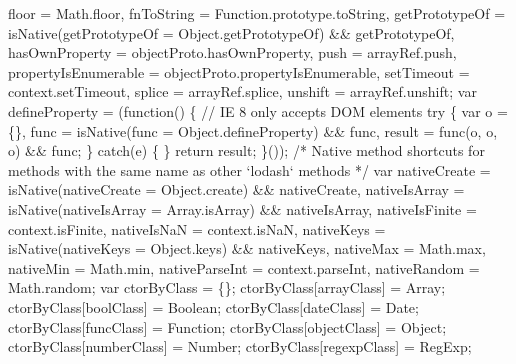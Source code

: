\begin{DoxyCodeInclude}
\textcolor{stringliteral}{        floor = Math.floor,}
\textcolor{stringliteral}{        fnToString = Function.prototype.toString,}
\textcolor{stringliteral}{        getPrototypeOf = isNative(getPrototypeOf = Object.getPrototypeOf) && getPrototypeOf,}
\textcolor{stringliteral}{        hasOwnProperty = objectProto.hasOwnProperty,}
\textcolor{stringliteral}{        push = arrayRef.push,}
\textcolor{stringliteral}{        propertyIsEnumerable = objectProto.propertyIsEnumerable,}
\textcolor{stringliteral}{        setTimeout = context.setTimeout,}
\textcolor{stringliteral}{        splice = arrayRef.splice,}
\textcolor{stringliteral}{        unshift = arrayRef.unshift;}
\textcolor{stringliteral}{}
\textcolor{stringliteral}{    var defineProperty = (function() \{}
\textcolor{stringliteral}{      // IE 8 only accepts DOM elements}
\textcolor{stringliteral}{      try \{}
\textcolor{stringliteral}{        var o = \{\},}
\textcolor{stringliteral}{            func = isNative(func = Object.defineProperty) && func,}
\textcolor{stringliteral}{            result = func(o, o, o) && func;}
\textcolor{stringliteral}{      \} catch(e) \{ \}}
\textcolor{stringliteral}{      return result;}
\textcolor{stringliteral}{    \}());}
\textcolor{stringliteral}{}
\textcolor{stringliteral}{    /* Native method shortcuts for methods with the same name as other `lodash` methods */}
\textcolor{stringliteral}{    var nativeCreate = isNative(nativeCreate = Object.create) && nativeCreate,}
\textcolor{stringliteral}{        nativeIsArray = isNative(nativeIsArray = Array.isArray) && nativeIsArray,}
\textcolor{stringliteral}{        nativeIsFinite = context.isFinite,}
\textcolor{stringliteral}{        nativeIsNaN = context.isNaN,}
\textcolor{stringliteral}{        nativeKeys = isNative(nativeKeys = Object.keys) && nativeKeys,}
\textcolor{stringliteral}{        nativeMax = Math.max,}
\textcolor{stringliteral}{        nativeMin = Math.min,}
\textcolor{stringliteral}{        nativeParseInt = context.parseInt,}
\textcolor{stringliteral}{        nativeRandom = Math.random;}
\textcolor{stringliteral}{}
\textcolor{stringliteral}{    var ctorByClass = \{\};}
\textcolor{stringliteral}{    ctorByClass[arrayClass] = Array;}
\textcolor{stringliteral}{    ctorByClass[boolClass] = Boolean;}
\textcolor{stringliteral}{    ctorByClass[dateClass] = Date;}
\textcolor{stringliteral}{    ctorByClass[funcClass] = Function;}
\textcolor{stringliteral}{    ctorByClass[objectClass] = Object;}
\textcolor{stringliteral}{    ctorByClass[numberClass] = Number;}
\textcolor{stringliteral}{    ctorByClass[regexpClass] = RegExp;}

\end{DoxyCodeInclude}
